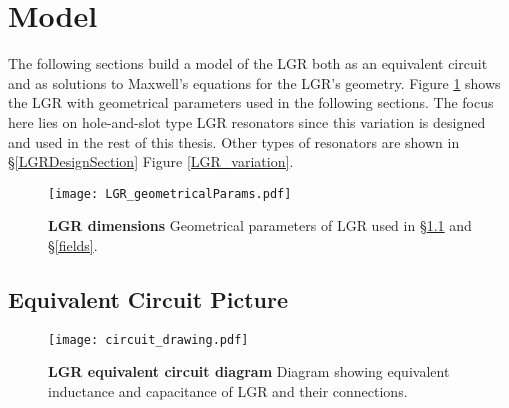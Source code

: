 \section{Model}

The following sections build a model of the LGR both as an equivalent circuit and as solutions to Maxwell's equations for the LGR's geometry. Figure \ref{LGR_geometry1} shows the LGR with geometrical parameters used in the following sections. The focus here lies on hole-and-slot type LGR resonators since this variation is designed and used in the rest of this thesis. Other types of resonators are shown in \S \ref{LGRDesignSection} Figure \ref{LGR_variation}.


\begin{figure}[h!]
\centering
\texttt{[image: LGR\_geometricalParams.pdf]}  
\caption{\textbf{LGR dimensions} Geometrical parameters of LGR used in \S \ref{circuit} and \S \ref{fields}.}
\label{LGR_geometry1}
\end{figure}


\subsection{Equivalent Circuit Picture} \label{circuit}

\begin{figure}[t!]
\centering
\texttt{[image: circuit\_drawing.pdf]}  
\caption{\textbf{LGR equivalent circuit diagram} Diagram showing equivalent inductance and capacitance of LGR and their connections.}
\label{circuitdiagram}
\end{figure}

